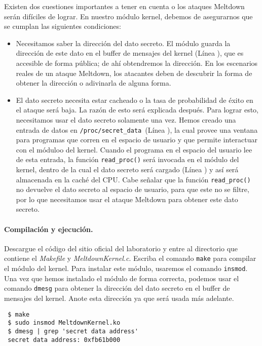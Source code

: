 Existen dos cuestiones importantes a tener en cuenta o los ataques Meltdown serán difíciles de lograr. En nuestro módulo kernel, debemos de asegurarnos que se cumplan las siguientes condiciones:

\begin{itemize}
\item Necesitamos saber la dirección del dato secreto. El módulo guarda la dirección de este dato en el buffer de mensajes del kernel (Línea ), que es accesible de forma pública; de ahí obtendremos la dirección. En los escenarios reales de un ataque Meltdown, los atacantes deben de descubrir la forma de obtener la dirección o adivinarla de alguna forma.

\item El dato secreto necesita estar cacheado o la tasa de probabilidad de éxito en el ataque será baja.  La razón de esto será explicada después. Para lograr esto, necesitamos usar el dato secreto solamente una vez. Hemos creado una entrada de datos en \texttt{/proc/secret\_data}~(Línea ), la cual provee una ventana para programas que corren en el espacio de usuario y que permite interactuar con el móduloo del kernel. Cuando el programa en el espacio del usuario lee de esta entrada, la función \texttt{read\_proc()} será invocada en el módulo del kernel, dentro de la cual el dato secreto será cargado (Línea ) y así será almacenada en la caché del CPU.
Cabe señalar que la función \texttt{read\_proc()} no devuelve el dato secreto al espacio de usuario, para que este no se filtre, por lo que necesitamos usar el ataque Meltdown para obtener este dato secreto.
\end{itemize}


\paragraph{Compilación y ejecución.}
Descargue el código del sitio oficial del laboratorio y entre al directorio que contiene el \textit{Makefile} y \textit{MeltdownKernel.c}. Escriba el comando \texttt{make} para compilar el módulo del kernel.
Para instalar este módulo, usaremos el comando  \texttt{insmod}. Una vez que hemos instalado el módulo de forma correcta, podemos usar el comando \texttt{dmesg} para obtener la dirección del dato secreto en el buffer de mensajes del kernel. Anote esta dirección ya que será usada más adelante.

\begin{lstlisting}
 $ make
 $ sudo insmod MeltdownKernel.ko
 $ dmesg | grep 'secret data address'
 secret data address: 0xfb61b000
\end{lstlisting}
 



